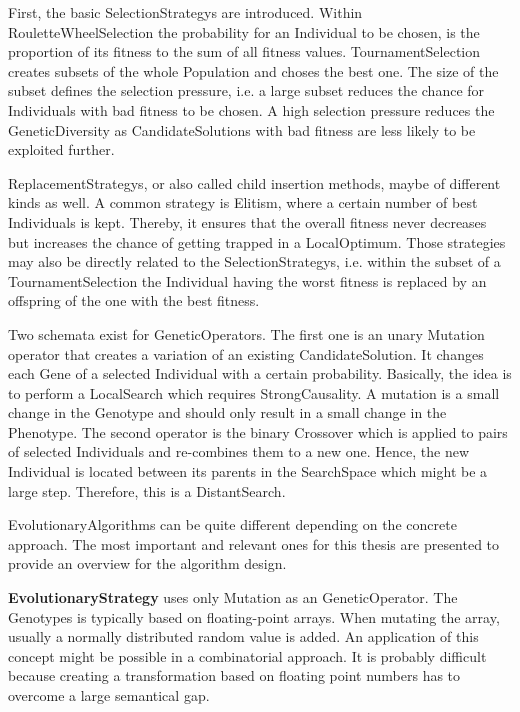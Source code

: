First, the basic \glspl{SelectionStrategy} are introduced. Within \gls{RouletteWheelSelection} the probability for an \gls{Individual} to be chosen, is the proportion of its fitness to the sum of all fitness values. \Gls{TournamentSelection} creates subsets of the whole \gls{Population} and choses the best one. The size of the subset defines the selection pressure, i.e. a large subset reduces the chance for \glspl{Individual} with bad fitness to be chosen. A high selection pressure reduces the \gls{GeneticDiversity} as \glspl{CandidateSolution} with bad fitness are less likely to be exploited further.

\Glspl{ReplacementStrategy}, or also called child insertion methods, maybe of different kinds as well. A common strategy is \gls{Elitism}, where a certain number of best \glspl{Individual} is kept. Thereby, it ensures that the overall fitness never decreases but increases the chance of getting trapped in a \gls{LocalOptimum}. Those strategies may also be directly related to the \glspl{SelectionStrategy}, i.e. within the subset of a \gls{TournamentSelection} the \gls{Individual} having the worst fitness is replaced by an offspring of the one with the best fitness.

Two schemata exist for \glspl{GeneticOperator}. The first one is an unary \gls{Mutation} operator that creates a variation of an existing \gls{CandidateSolution}. It changes each \gls{Gene} of a selected \gls{Individual} with a certain probability. Basically, the idea is to perform a \gls{LocalSearch} which requires \gls{StrongCausality}. A mutation is a small change in the \gls{Genotype} and should only result in a small change in the \gls{Phenotype}. The second operator is the binary \gls{Crossover} which is applied to pairs of selected \glspl{Individual} and re-combines them to a new one. Hence, the new \gls{Individual} is located between its parents in the \gls{SearchSpace} which might be a large step. Therefore, this is a \gls{DistantSearch}.

\Glspl{EvolutionaryAlgorithm} can be quite different depending on the concrete approach. The most important and relevant ones for this thesis are presented to provide an overview for the algorithm design.

\textbf{\Gls{EvolutionaryStrategy}} \cite{rechenberg73} uses only \gls{Mutation} as an \gls{GeneticOperator}. The \glspl{Genotype} is typically based on floating-point arrays. When mutating the array, usually a normally distributed random value is added. An application of this concept might be possible in a combinatorial approach. It is probably difficult because creating a transformation based on floating point numbers has to overcome a large semantical gap.


